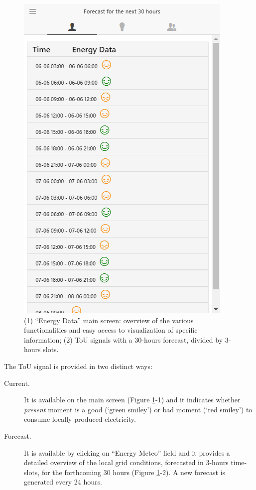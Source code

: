 \begin{figure}
\begin{center}
\begin{minipage}[htb]{0.45\linewidth}
         \includegraphics[width=1\linewidth]{img/touprediction.png}   
        \end{minipage}
      \end{center}
      \caption{(1) ``Energy Data'' main screen: overview of the various functionalities and easy access to visualization of specific information;
(2) ToU signals with a 30-hours forecast, divided by 3-hours slots.}\label{fig:overview-tou}
\end{figure}

The ToU signal is provided in two distinct ways:
\begin{description}
 \item[Current.] It is available on the main screen (Figure \ref{fig:overview-tou}-1) and it indicates whether \textit{present} moment is a good (`green smiley') or bad moment (`red smiley')
 to consume locally produced electricity.
 \item[Forecast.] It is available by clicking on ``Energy Meteo'' field and it provides a detailed overview of the local grid conditions, forecasted in 3-hours time-slots, for the forthcoming 30 hours (Figure \ref{fig:overview-tou}-2). A new forecast is generated every 24 hours.
\end{description}



